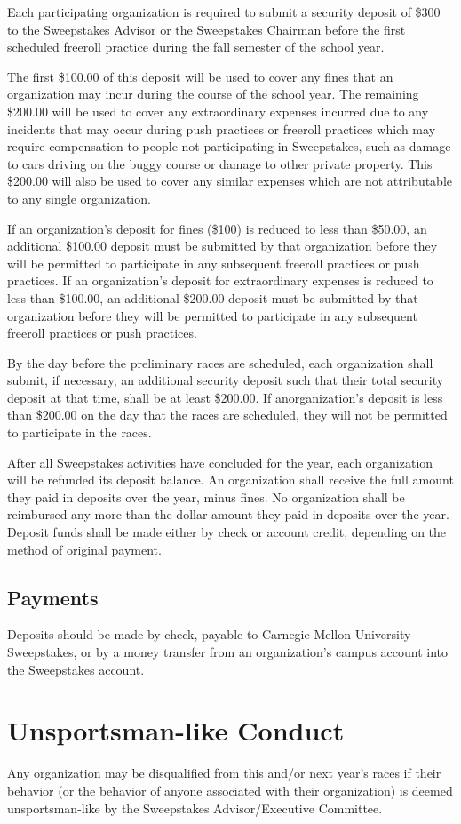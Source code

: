 	Each participating organization is required to submit a security deposit of
	\$300 to the Sweepstakes Advisor or the Sweepstakes Chairman before the first
	scheduled freeroll practice during the fall semester of the school year.

	The first \$100.00 of this deposit will be used to cover any fines that an
	organization may incur during the course of the school year. The remaining
	\$200.00 will be used to cover any extraordinary expenses incurred due to any
	incidents that may occur during push practices or freeroll practices which may
	require compensation to people not participating in Sweepstakes, such as damage
	to cars driving on the buggy course or damage to other private property. This
	\$200.00 will also be used to cover any similar expenses which are not
	attributable to any single organization.

	If an organization's deposit for fines (\$100) is reduced to less than \$50.00,
	an additional \$100.00 deposit must be submitted by that organization before
	they will be permitted to participate in any subsequent freeroll practices or
	push practices. If an organization's deposit for extraordinary expenses is
	reduced to less than \$100.00, an additional \$200.00 deposit must be submitted
	by that organization before they will be permitted to participate in any
	subsequent freeroll practices or push practices.

	By the day before the preliminary races are scheduled, each organization shall
	submit, if necessary, an additional security deposit such that their total
	security deposit at that time, shall be at least \$200.00. If anorganization's
	deposit is less than \$200.00 on the day that the races are scheduled, they
	will not be permitted to participate in the races.

	After all Sweepstakes activities have concluded for the year, each organization
	will be refunded its deposit balance. An organization shall receive the full
	amount they paid in deposits over the year, minus fines. No organization shall
	be reimbursed any more than the dollar amount they paid in deposits over the
	year. Deposit funds shall be made either by check or account credit, depending
	on the method of original payment.

\subsection{Payments}

	Deposits should be made by check, payable to Carnegie Mellon University -
	Sweepstakes, or by a money transfer from an organization's campus account into
	the Sweepstakes account.

\section{Unsportsman-like Conduct}

	Any organization may be disqualified from this and/or next year's races if
	their behavior (or the behavior of anyone associated with their organization)
	is deemed unsportsman-like by the Sweepstakes Advisor/Executive Committee.


